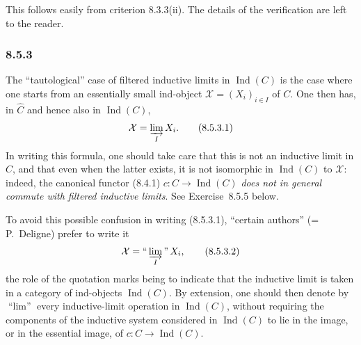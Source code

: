 \documentclass[11pt]{article}
\newcommand{\Ind}{\operatorname{Ind}}
\begin{document}
This follows easily from criterion 8.3.3(ii). The details of the verification are left to the reader.

\subsubsection*{8.5.3}
The ``tautological'' case of filtered inductive limits in $\Ind(C)$ is the case where one starts from an essentially small ind-object $\mathcal X=(X_i)_{i\in I}$ of $C$. One then has, in $\widehat C$ and hence also in $\Ind(C)$,
\[
\mathcal X=\varinjlim_I X_i.
\tag{8.5.3.1}
\]
In writing this formula, one should take care that this is not an inductive limit in $C$, and that even when the latter exists, it is not isomorphic in $\Ind(C)$ to $\mathcal X$: indeed, the canonical functor (8.4.1) $c:C\to\Ind(C)$ \emph{does not in general commute with filtered inductive limits}. See Exercise~8.5.5 below.

To avoid this possible confusion in writing (8.5.3.1), ``certain authors'' (= P.~Deligne) prefer to write it
\[
\mathcal X=\textrm{``}\varinjlim_I\textrm{''}\,X_i,
\tag{8.5.3.2}
\]
the role of the quotation marks being to indicate that the inductive limit is taken in a category of ind-objects $\Ind(C)$. By extension, one should then denote by $\textrm{``}\lim\textrm{''}$ every inductive-limit operation in $\Ind(C)$, without requiring the components of the inductive system considered in $\Ind(C)$ to lie in the image, or in the essential image, of $c:C\to\Ind(C)$.
\end{document}
